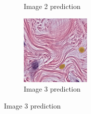 \begin{figure}[H]
\begin{subfigure}[b]{0.32\textwidth}
    \caption{Image 2 prediction}
  \end{subfigure}\hfill
  \begin{subfigure}[b]{0.32\textwidth}
    \centering
    \includegraphics[width=\linewidth]{assets/images/for_presentation/exp-2-3-pred.png}
    \caption{Image 3 prediction}
  \end{subfigure}

  \par\vspace{0.5em}


\end{figure}
